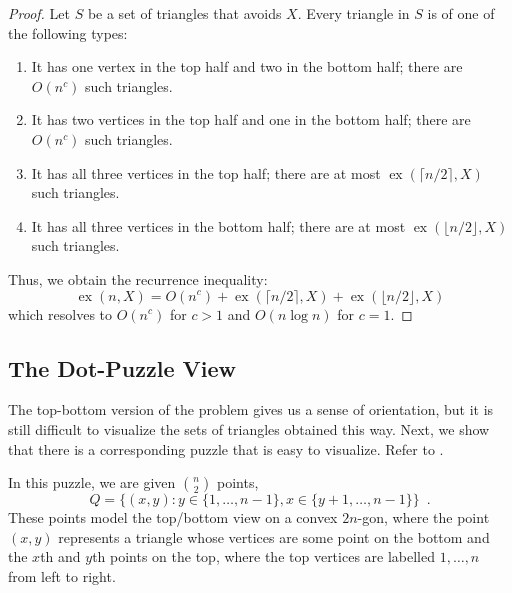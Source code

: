 \documentclass{patmorin}
\DeclareMathOperator{\ex}{ex}
\begin{document}
\begin{proof}
   Let $S$ be a set of triangles that avoids $X$.  Every triangle in $S$
   is of one of the following types:
   \begin{enumerate}
      \item It has one vertex in the top half and two in the bottom half;
        there are $O(n^{c})$ such triangles.
      \item It has two vertices in the top half and one in the bottom
        half; there are $O(n^{c})$ such triangles.
      \item It has all three vertices in the top half; there are at most
        $\ex(\lceil n/2\rceil,X)$ such triangles.
      \item It has all three vertices in the bottom half; there are at
        most $\ex(\lfloor n/2\rfloor,X)$ such triangles.
   \end{enumerate}
   Thus, we obtain the recurrence inequality:
   \[  \ex(n,X) = O(n^{c}) + \ex(\lceil n/2\rceil,X) + \ex(\lfloor n/2\rfloor,X) \]
   which resolves to $O(n^c)$ for $c>1$ and $O(n\log n)$ for $c=1$.
\end{proof}


\subsection{The Dot-Puzzle View}

The top-bottom version of the problem gives us a sense of orientation,
but it is still difficult to visualize the sets of triangles obtained
this way. Next, we show that there is a corresponding puzzle that is
easy to visualize.  Refer to .  

In this puzzle, we are given $\binom{n}{2}$ points,
\[
    Q = \{(x,y): y\in\{1,\ldots,n-1\}, x\in\{y+1,\ldots,n-1\} \} \enspace .
\]
These points model the top/bottom view on a convex $2n$-gon, where the
point $(x,y)$ represents a triangle whose vertices are some point on
the bottom and the $x$th and $y$th points on the top, where the top
vertices are labelled $1,\ldots,n$ from left to right.
\end{document}
